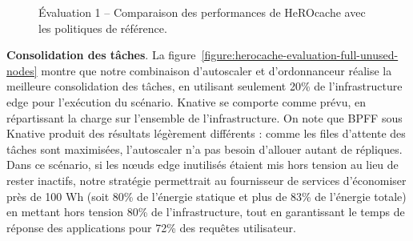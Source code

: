 {\begin{figure}[!ht]
    \center
    \qquad
    \qquad
    \caption{Évaluation 1 -- Comparaison des performances de HeROcache avec les politiques de référence.}
    \label{figure:herocache-evaluation-full}
\end{figure}

\textbf{Consolidation des tâches}. La figure~\ref{figure:herocache-evaluation-full-unused-nodes} montre que notre combinaison d'autoscaler et d'ordonnanceur réalise la meilleure consolidation des tâches, en utilisant seulement 20\% de l'infrastructure edge pour l'exécution du scénario. Knative se comporte comme prévu, en répartissant la charge sur l'ensemble de l'infrastructure. On note que BPFF sous Knative produit des résultats légèrement différents : comme les files d'attente des tâches sont maximisées, l'autoscaler n'a pas besoin d'allouer autant de répliques. Dans ce scénario, si les nœuds edge inutilisés étaient mis hors tension au lieu de rester inactifs, notre stratégie permettrait au fournisseur de services d'économiser près de 100 Wh (soit 80\% de l'énergie statique et plus de 83\% de l'énergie totale) en mettant hors tension 80\% de l'infrastructure, tout en garantissant le temps de réponse des applications pour 72\% des requêtes utilisateur.

}

